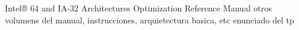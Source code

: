 Intel® 64 and IA-32 Architectures Optimization Reference Manual
otros volumens del manual, instrucciones, arquietectura basica, etc
enunciado del tp